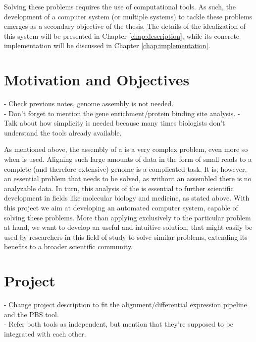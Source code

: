 Solving these problems requires the use of computational tools. As such, the
development of a computer system (or multiple systems) to tackle these problems
emerges as a secondary objective of the thesis. The details of the idealization
of this system will be presented in Chapter \ref{chap:description}, while its
concrete implementation will be discussed in Chapter \ref{chap:implementation}.

\section{Motivation and Objectives} \label{sec:motivation}

\begin{Notes}
- Check previous notes, genome assembly is not needed.\\
- Don't forget to mention the gene enrichment/protein binding site analysis.
- Talk about how simplicity is needed because many times biologists don't
understand the tools already available.
\end{Notes}

As mentioned above, the assembly of a \trans{} is a very complex problem, even
more so when \rnaseq{} is used. Aligning such large amounts of data in the form
of small reads to a complete (and therefore extensive) genome is a complicated
task. It is, however, an essential problem that needs to be solved, as without
an assembled \trans{} there is no analyzable data. In turn, this analysis of the
\trans{} is essential to further scientific development in fields like
molecular biology and medicine, as stated above. With this project we aim at
developing an automated computer system, capable of solving these problems. More
than applying exclusively to the particular problem at hand, we want to develop
an useful and intuitive solution, that might easily be used by researchers in
this field of study to solve similar problems, extending its benefits to a
broader scientific community.

\section{Project} \label{sec:project}

\begin{Notes}
- Change project description to fit the alignment/differential expression
pipeline and the PBS tool.\\
- Refer both tools as independent, but mention that they're supposed to be
integrated with each other.\\
\end{Notes}

